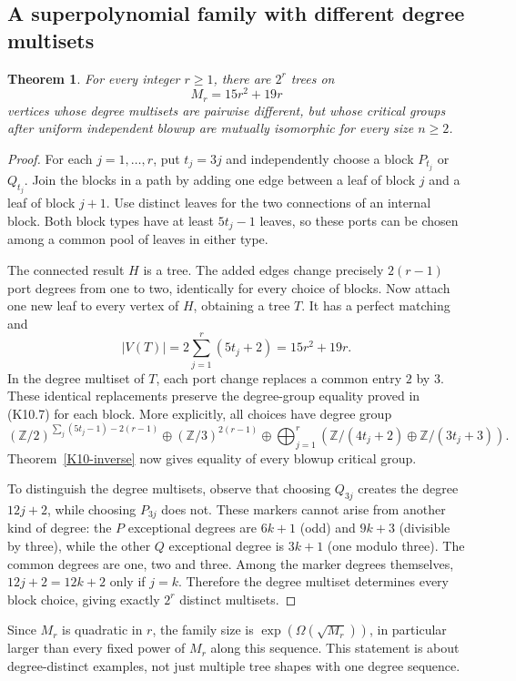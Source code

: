 \documentclass[11pt,a4paper]{article}
\newtheorem{theorem}{Theorem}[section]
\theoremstyle{definition}\newtheorem{definition}[theorem]{Definition}
\theoremstyle{remark}\newtheorem{remark}[theorem]{Remark}
\newcommand{\Z}{\mathbb Z}\newcommand{\Q}{\mathbb Q}\newcommand{\F}{\mathbb F}
\numberwithin{equation}{section}
\begin{document}
\subsection{A superpolynomial family with different degree multisets}\label{K10-sec-5}
\begin{theorem}\label{K10-family}
For every integer $r\geq1$, there are $2^r$ trees on
\[
 M_r=15r^2+19r
\]
vertices whose degree multisets are pairwise different, but whose critical groups after uniform independent blowup are mutually isomorphic for every size $n\geq2$.
\end{theorem}
\begin{proof}
For each $j=1,\ldots,r$, put $t_j=3j$ and independently choose a block $P_{t_j}$ or $Q_{t_j}$. Join the blocks in a path by adding one edge between a leaf of block $j$ and a leaf of block $j+1$. Use distinct leaves for the two connections of an internal block. Both block types have at least $5t_j-1$ leaves, so these ports can be chosen among a common pool of leaves in either type.

The connected result $H$ is a tree. The added edges change precisely $2(r-1)$ port degrees from one to two, identically for every choice of blocks. Now attach one new leaf to every vertex of $H$, obtaining a tree $T$. It has a perfect matching and
\[
 |V(T)|=2\sum_{j=1}^r(5t_j+2)=15r^2+19r.
\]
In the degree multiset of $T$, each port change replaces a common entry $2$ by $3$. These identical replacements preserve the degree-group equality proved in (K10.7) for each block. More explicitly, all choices have degree group
\[
 (\Z/2)^{\sum_j(5t_j-1)-2(r-1)}\oplus(\Z/3)^{2(r-1)}
 \oplus\bigoplus_{j=1}^r
       \left(\Z/(4t_j+2)\oplus\Z/(3t_j+3)\right).           \tag{K10.11}
\]
Theorem~\ref{K10-inverse} now gives equality of every blowup critical group.

To distinguish the degree multisets, observe that choosing $Q_{3j}$ creates the degree $12j+2$, while choosing $P_{3j}$ does not. These markers cannot arise from another kind of degree: the $P$ exceptional degrees are $6k+1$ (odd) and $9k+3$ (divisible by three), while the other $Q$ exceptional degree is $3k+1$ (one modulo three). The common degrees are one, two and three. Among the marker degrees themselves, $12j+2=12k+2$ only if $j=k$. Therefore the degree multiset determines every block choice, giving exactly $2^r$ distinct multisets.
\end{proof}
Since $M_r$ is quadratic in $r$, the family size is $\exp(\Omega(\sqrt{M_r}))$, in particular larger than every fixed power of $M_r$ along this sequence. This statement is about degree-distinct examples, not just multiple tree shapes with one degree sequence.
\end{document}
